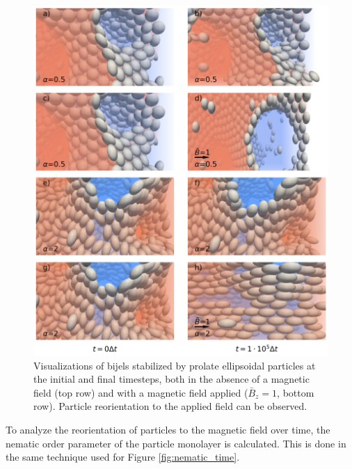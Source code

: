 \begin{figure} 
\centering 
\includegraphics[scale=0.4]{../figures/results/paper2/particle_viz-field_on.png} 
\caption{Visualizations of bijels stabilized by prolate ellipsoidal particles at the initial and final timesteps, 
         both in the absence of a magnetic field (top row) and with a magnetic field applied (\(\bar{B}_z = 1\), bottom row). Particle reorientation to the
         applied field can be observed.} 
\label{fig:particle_viz-field_on} 
\end{figure}

To analyze the reorientation of particles to the magnetic field over time, the nematic order parameter of the particle monolayer is calculated. This is done
in the same technique used for Figure \ref{fig:nematic_time}. 

